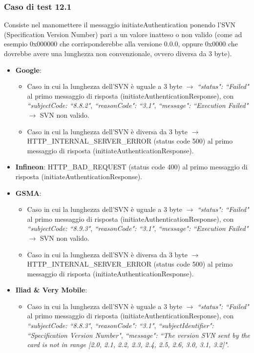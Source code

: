\documentclass[10pt, oneside]{book}
\begin{document}
\subsubsection{Caso di test 12.1}
Consiste nel manomettere il messaggio initiateAuthentication ponendo l'SVN (Specification Version Number) pari a un valore inatteso o non valido (come ad esempio 0x000000 che corrisponderebbe alla versione 0.0.0, oppure 0x0000 che dovrebbe avere una lunghezza non convenzionale, ovvero diversa da 3 byte).
\begin{itemize}
\item \textbf{Google}:
\begin{itemize}
\item Caso in cui la lunghezza dell'SVN è uguale a 3 byte $\rightarrow$ \textit{``status": ``Failed"} al primo messaggio di risposta (initiateAuthenticationResponse), con \textit{``subjectCode: ``8.8.2"}, \textit{``reasonCode": ``3.1"}, \textit{``message": ``Execution Failed"} $\rightarrow$ SVN non valido.
\item Caso in cui la lunghezza dell'SVN è diversa da 3 byte $\rightarrow$\\HTTP\_INTERNAL\_SERVER\_ERROR (status code 500) al primo messaggio di risposta (initiateAuthenticationResponse).
\end{itemize}
\item \textbf{Infineon}: HTTP\_BAD\_REQUEST (status code 400) al primo messaggio di risposta (initiateAuthenticationResponse).
\item \textbf{GSMA}:
\begin{itemize}
\item Caso in cui la lunghezza dell'SVN è uguale a 3 byte $\rightarrow$ \textit{``status": ``Failed"} al primo messaggio di risposta (initiateAuthenticationResponse), con \textit{``subjectCode: ``8.9.3"}, \textit{``reasonCode": ``3.1"}, \textit{``message": ``Execution Failed"} $\rightarrow$ SVN non valido.
\item Caso in cui la lunghezza dell'SVN è diversa da 3 byte $\rightarrow$\\HTTP\_INTERNAL\_SERVER\_ERROR (status code 500) al primo messaggio di risposta (initiateAuthenticationResponse).
\end{itemize}
\item \textbf{Iliad \& Very Mobile}:
\begin{itemize}
\item Caso in cui la lunghezza dell'SVN è uguale a 3 byte $\rightarrow$ \textit{``status": ``Failed"} al primo messaggio di risposta (initiateAuthenticationResponse), con \textit{``subjectCode: ``8.8.3"}, \textit{``reasonCode": ``3.1"}, \textit{``subjectIdentifier": ``Specification Version Number"}, \textit{``message": ``The version SVN sent by the card is not in range [2.0, 2.1, 2.2, 2.3, 2.4, 2.5, 2.6, 3.0, 3.1, 3.2]"}.

\end{itemize}
\end{itemize}
\end{document}
